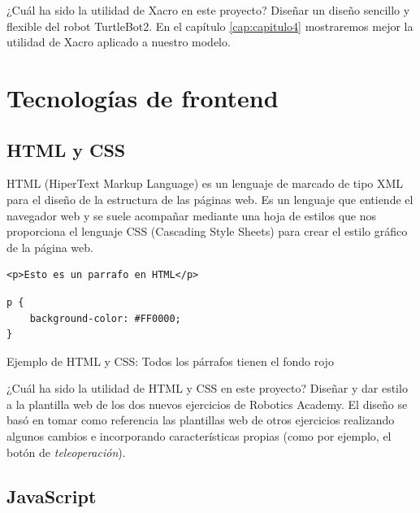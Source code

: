 ¿Cuál ha sido la utilidad de Xacro en este proyecto? Diseñar un diseño sencillo y flexible del robot TurtleBot2. En el capítulo \ref{cap:capitulo4} mostraremos mejor la utilidad de Xacro aplicado a nuestro modelo.\\



\section{Tecnologías de frontend}
\label{sec:tecnologias_frontend}

\subsection{HTML y CSS}
\label{subsec:html_css}

HTML (HiperText Markup Language) es un lenguaje de marcado de tipo XML para el diseño de la estructura de las páginas web. Es un lenguaje que entiende el navegador web y se suele acompañar mediante una hoja de estilos que nos proporciona el lenguaje CSS (Cascading Style Sheets) para crear el estilo gráfico de la página web.\\


\begin{code}[H]
\begin{lstlisting}
<p>Esto es un parrafo en HTML</p>
\end{lstlisting}
\begin{lstlisting}
p {
	background-color: #FF0000;
}
\end{lstlisting}
\caption[Ejemplo de HTML y CSS]{Ejemplo de HTML y CSS: Todos los párrafos tienen el fondo rojo}
\label{cod:codigo_urdf}
\end{code}

¿Cuál ha sido la utilidad de HTML y CSS en este proyecto? Diseñar y dar estilo a la plantilla web de los dos nuevos ejercicios de Robotics Academy. El diseño se basó en tomar como referencia las plantillas web de otros ejercicios realizando algunos cambios e incorporando características propias (como por ejemplo, el botón de \textit{teleoperación}).\\




\subsection{JavaScript}
\label{subsec:JavaScript}

